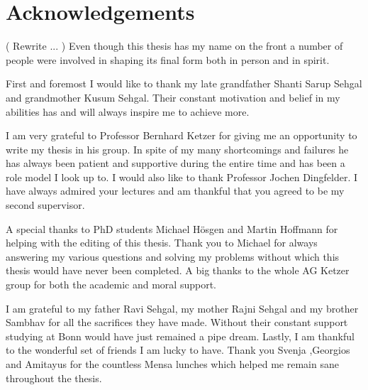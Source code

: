 \chapter*{Acknowledgements}
\label{sec:ack}
( Rewrite ... )
Even though this thesis has my name on the front a number of people were involved in shaping its final form both in person and in spirit.

First and foremost I would like to thank my late grandfather Shanti Sarup Sehgal and grandmother Kusum Sehgal. Their constant motivation and belief in my abilities has and will always inspire me to achieve more.

I am very grateful to Professor Bernhard Ketzer for giving me an opportunity to write my thesis in his group. In spite of my many shortcomings and failures he has always been patient and supportive during the entire time and has been a role model I look up to. I would also like to thank Professor Jochen Dingfelder. I have always admired your lectures and am thankful that you agreed to be my second supervisor.

A special thanks to PhD students Michael Hösgen and Martin Hoffmann for helping with the editing of this thesis. Thank you to Michael for always answering my various questions and solving my problems without which this thesis would have never been completed. A big thanks to the whole AG Ketzer group for both the academic and moral support.

I am grateful to my father Ravi Sehgal, my mother Rajni Sehgal and my brother Sambhav for all the sacrifices they have made. Without their constant support studying at Bonn would have just remained a pipe dream. Lastly, I am thankful to the wonderful set of friends I am lucky to have. Thank you Svenja ,Georgios and Amitayus for the countless Mensa lunches which helped me remain sane throughout the thesis.

